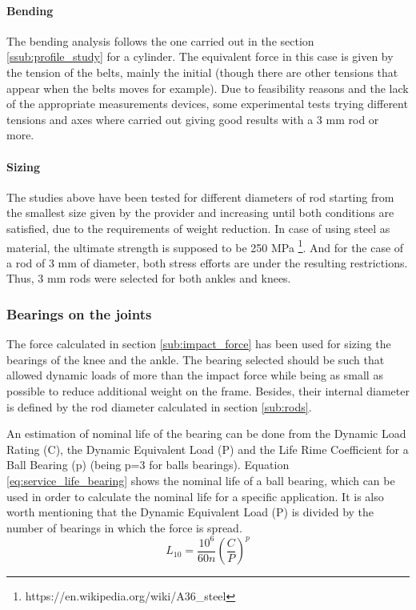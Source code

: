   \paragraph{Bending} %
  \label{ssub:bending}
  The bending analysis follows the one carried out in the section \ref{ssub:profile_study} for a cylinder.
  The equivalent force in this case is given by the tension of the belts, mainly the initial (though there are other tensions that appear when the belts moves for example).
  Due to feasibility reasons and the lack of the appropriate measurements devices, some experimental tests trying different tensions and axes where carried out giving good results with a 3 mm rod or more.

  \paragraph{Sizing} %
  \label{ssub:sizing}
  The studies above have been tested for different diameters of rod starting from the smallest size given by the provider and increasing until both conditions are satisfied, due to the requirements of weight reduction.
  In case of using steel as material, the ultimate strength is supposed to be 250 MPa \footnote{https://en.wikipedia.org/wiki/A36\_steel}.
  And for the case of a rod of 3 mm of diameter, both stress efforts are under the resulting restrictions.
  Thus, 3 mm rods were selected for both ankles and knees.

\subsubsection{Bearings on the joints} %
\label{ssub:bearings}
The force calculated in section \ref{sub:impact_force} has been used for sizing the bearings of the knee and the ankle.
The bearing selected should be such that allowed dynamic loads of more than the impact force while being as small as possible to reduce additional weight on the frame.
Besides, their internal diameter is defined by the rod diameter calculated in section \ref{sub:rods}.

An estimation of nominal life of the bearing can be done from the Dynamic Load Rating (C), the Dynamic Equivalent Load (P) and the Life Rime Coefficient for a Ball Bearing (p) (being p=3 for balls bearings).
Equation \ref{eq:service_life_bearing} shows the nominal life of a ball bearing, which can be used in order to calculate the nominal life for a specific application.
It is also worth mentioning that the Dynamic Equivalent Load (P) is divided by the number of bearings in which the force is spread.
\begin{equation}
  \label{eq:service_life_bearing}
  L_{10} = \frac{10^{6}}{60 n} \left(\frac{C}{P}\right)^{p}
\end{equation}

